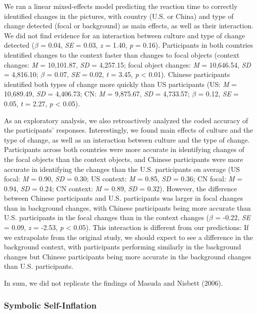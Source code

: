 \documentclass[
  man,floatsintext]{apa6}
\begin{document}
We ran a linear mixed-effects model predicting the reaction time to correctly identified changes in the pictures, with country (U.S. or China) and type of change detected (focal or background) as main effects, as well as their interaction. We did not find evidence for an interaction between culture and type of change detected (\(\beta\) = 0.04, \emph{SE} = 0.03, \emph{z} = 1.40, \emph{p} = 0.16). Participants in both countries identified changes to the context faster than changes to focal objects (context changes: \emph{M} = 10,101.87, \emph{SD} = 4,257.15; focal object changes: \emph{M} = 10,646.54, \emph{SD} = 4,816.10; \(\beta\) = 0.07, \emph{SE} = 0.02, \emph{t} = 3.45, \emph{p} \textless{} 0.01). Chinese participants identified both types of change more quickly than US participants (US: \emph{M} = 10,689.49, \emph{SD} = 4,406.73; CN: \emph{M} = 9,875.67, \emph{SD} = 4,733.57; \(\beta\) = 0.12, \emph{SE} = 0.05, \emph{t} = 2.27, \emph{p} \textless{} 0.05).

As an exploratory analysis, we also retroactively analyzed the coded accuracy of the participants' responses. Interestingly, we found main effects of culture and the type of change, as well as an interaction between culture and the type of change. Participants across both countries were more accurate in identifying changes of the focal objects than the context objects, and Chinese participants were more accurate in identifying the changes than the U.S. participants on average (US focal: \emph{M} = 0.90, \emph{SD} = 0.30; US context: \emph{M} = 0.85, \emph{SD} = 0.36; CN focal: \emph{M} = 0.94, \emph{SD} = 0.24; CN context: \emph{M} = 0.89, \emph{SD} = 0.32). However, the difference between Chinese participants and U.S. participants was larger in focal changes than in background changes, with Chinese participants being more accurate than U.S. participants in the focal changes than in the context changes (\(\beta\) = -0.22, \emph{SE} = 0.09, \emph{z} = -2.53, \emph{p} \textless{} 0.05). This interaction is different from our predictions: If we extrapolate from the original study, we should expect to see a difference in the background context, with participants performing similarly in the background changes but Chinese participants being more accurate in the background changes than U.S. participants.

In sum, we did not
replicate the findings of Masuda and Nisbett (2006).

\hypertarget{symbolic-self-inflation-3}{%
\subsubsection{Symbolic Self-Inflation}\label{symbolic-self-inflation-3}}
\end{document}
